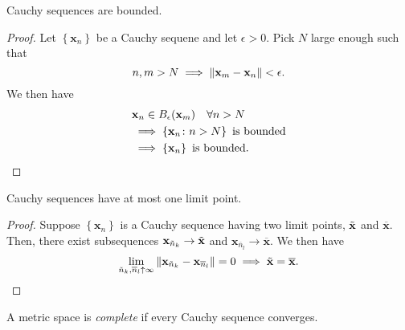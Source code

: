 \begin{prop}
    Cauchy sequences are bounded.
\end{prop}
\begin{proof}
    Let $\left\{ \mathbf{x}_n \right\}$ be a Cauchy sequene and let $\epsilon > 0$. Pick $N$ large enough such that 
    \[
        n,m > N \implies \norm{\mathbf{x}_m - \mathbf{x}_n} < \epsilon.
    \]
    We then have
    \begin{align*}
        &\mathbf{x}_n \in B_{\epsilon}(\mathbf{x}_m) \quad \forall n > N \\
        &\implies \left\{ \mathbf{x}_n \colon n > N\right\} \text{ is bounded} \\
        &\implies \left\{ \mathbf{x}_n \right\} \text{ is bounded.} \qedhere
    \end{align*}
\end{proof} 
\begin{prop}
    Cauchy sequences have at most one limit point.
\end{prop}
\begin{proof}
    Suppose $\left\{ \mathbf{x}_n \right\}$ is a Cauchy sequence having two limit points, $\Tilde{\mathbf{x}}$ and $\overline{\mathbf{x}}$. Then, there exist subsequences $\mathbf{x}_{\Tilde{n}_k} \to \Tilde{\mathbf{x}}$ and $\mathbf{x}_{\overline{n}_l} \to \overline{\mathbf{x}}$. We then have
    \[
        \lim_{\Tilde{n}_k, \overline{n}_l \uparrow \infty} \norm{\mathbf{x}_{\Tilde{n}_k} - \mathbf{x}_{\overline{n}_l}} = 0 \implies \Tilde{\mathbf{x}} = \overline{\mathbf{x}}. \qedhere
    \]
\end{proof}
\begin{defn}
    A metric space is \emph{complete} if every Cauchy sequence converges.
\end{defn}